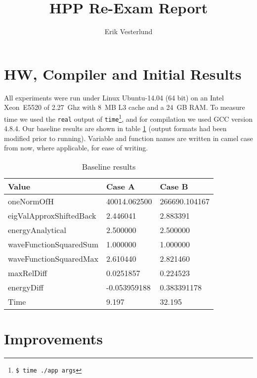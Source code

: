\documentclass[a4paper, 11pt]{article}
\title{HPP Re-Exam Report}
\author{Erik Vesterlund}
\begin{document}
\maketitle

\section{HW, Compiler and Initial Results}

All experiments were run under Linux Ubuntu-14.04 (64 bit) on an Intel Xeon~E5520 of 2.27~Ghz with 8~MB L3 cache and a 24~GB RAM. To measure time we used the \texttt{real} output of \texttt{time}\footnote{\texttt{\$ time ./app args}}, and for compilation we used GCC version 4.8.4. Our baseline results are shown in table \ref{table:baseline} (output formats had been modified prior to running).  Variable and function names are written in camel case from now, where applicable, for ease of writing.

\begin{table}[!h]
\centering
\begin{tabular}{|l|l|l|}
\hline
\textbf{Value} & \textbf{Case A}       & \textbf{Case B}        \\ \hline
oneNormOfH              & 40014.062500 & 266690.104167 \\ \hline
eigValApproxShiftedBack & 2.446041     & 2.883391      \\ \hline
energyAnalytical        & 2.500000     & 2.500000      \\ \hline
waveFunctionSquaredSum  & 1.000000     & 1.000000      \\ \hline
waveFunctionSquaredMax  & 2.610440     & 2.821460      \\ \hline
maxRelDiff              & 0.0251857    & 0.224523      \\ \hline
energyDiff              & -0.053959188 & 0.383391178   \\ \hline
Time                    & 9.197        & 32.195        \\ \hline
\end{tabular}
\caption{Baseline results}
\label{table:baseline}
\end{table}

\section{Improvements}

\end{document}
